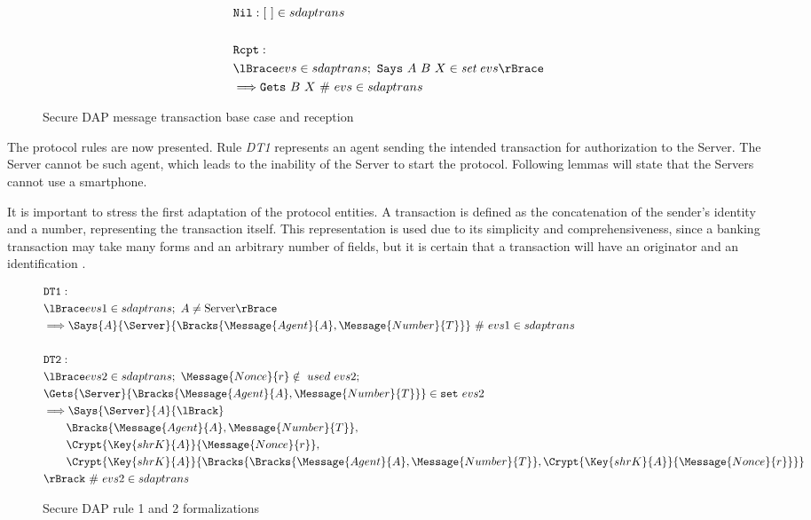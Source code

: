 \begin{figure}
  \begin{align*}
    & \texttt{Nil}: [ \ ] \in sdaptrans \\
    & \\
    & \texttt{Rcpt}: \newline \\
    & \lBrace evs \in sdaptrans;\ \texttt{Says} \ A \ B \ X \in \textit{set}\ evs \rBrace \\
    & \Longrightarrow \texttt{Gets} \ B \ X \ \#\ evs \in sdaptrans
  \end{align*}
  \label{fig:dap-model-0}
  \caption{Secure DAP message transaction base case and reception}
\end{figure}

The protocol rules are now presented. Rule \textit{DT1} represents an agent sending the intended transaction for authorization to the Server. The Server cannot be such agent, which leads to the inability of the Server to start the protocol. Following lemmas will state that the Servers cannot use a smartphone.

It is important to stress the first adaptation of the protocol entities. A transaction is defined as the concatenation of the sender's identity and a number, representing the transaction itself. This representation is used due to its simplicity and comprehensiveness, since a banking transaction may take many forms and an arbitrary number of fields, but it is certain that a transaction will have an originator and an identification \cite{Hutchinson2003}.

\begin{figure}[h!]
  \begin{align*}
    & \texttt{DT1}: \\
    & \lBrace evs1 \in sdaptrans;\ A \neq \text{Server} \rBrace \\
    & \Longrightarrow \Says{A}{\Server}{\Bracks{\Message{Agent}{A}, \Message{Number}{T}}} \ \# \ evs1 \in sdaptrans \\
    & \\
    & \texttt{DT2}: \newline \\
    & \lBrace evs2 \in sdaptrans;\ \Message{Nonce}{r} \notin\ used\ evs2; \\
    & \Gets{\Server}{\Bracks{\Message{Agent}{A}, \Message{Number}{T}}} \in \texttt{set} \ evs2 \\
    & \Longrightarrow \Says{\Server}{A}{\lBrack} \\
    & \qquad \Bracks{\Message{Agent}{A}, \Message{Number}{T}}, \\
    & \qquad \Crypt{\Key{shrK}{A}}{\Message{Nonce}{r}}, \\
    & \qquad \Crypt{\Key{shrK}{A}}{\Bracks{\Bracks{\Message{Agent}{A}, \Message{Number}{T}}, \Crypt{\Key{shrK}{A}}{\Message{Nonce}{r}}}} \\
    & \rBrack \ \# \ evs2 \in sdaptrans
  \end{align*}
  \caption{Secure DAP rule 1 and 2 formalizations}
  \label{fig:dap-model-1-n-2}
\end{figure}

